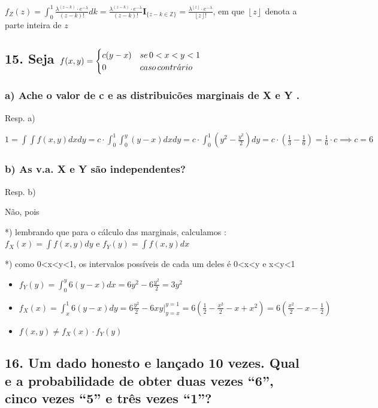 \documentclass[english]{article}
\begin{document}
$f_{Z}(z)=\int_{0}^{1}\frac{\lambda^{(z-k)}\cdot e^{-\lambda}}{(z-k)!}dk=\frac{\lambda^{(z-k)}\cdot e^{-\lambda}}{(z-k)!}\mathbf{I}_{\{z-k\in\mathbb{Z}\}}=\frac{\lambda^{\left\lfloor z\right\rfloor }\cdot e^{-\lambda}}{\left\lfloor z\right\rfloor !}$,
em que $\left\lfloor z\right\rfloor $ denota a parte inteira de $z$


\subsection*{\textmd{15. Seja $f(x,y)=\protect\begin{cases}
c(y-x) & se\,0<x<y<1\protect\\
0 & caso\, contr\acute{a}rio
\protect\end{cases}$}}


\subsubsection*{\textmd{a) Ache o valor de c e as distribuicões marginais de X e
Y . }}

Resp. a)

$1=\int\int f(x,y)dxdy=c\cdot\int_{0}^{1}\int_{0}^{y}(y-x)dxdy=c\cdot\int_{0}^{1}(y^{2}-\frac{y^{2}}{2})dy=c\cdot(\frac{1}{3}-\frac{1}{6})=\frac{1}{6}\cdot c\implies c=6$


\subsubsection*{\textmd{b) As v.a. X e Y são independentes? }}

Resp. b)

Não, pois 

{*}) lembrando que para o cálculo das marginais, calculamos : $f_{X}(x)=\int f(x,y)dy$
e $f_{Y}(y)=\int f(x,y)dx$

{*}) como 0<x<y<1, os intervalos possíveis de cada um deles é 0<x<y
e x<y<1
\begin{itemize}
\item $f_{Y}(y)=\int_{0}^{y}6(y-x)dx=6y^{2}-6\frac{y^{2}}{2}=3y^{2}$
\item $f_{X}(x)=\int_{x}^{1}6(y-x)dy=6\frac{y^{2}}{2}-6xy|_{y=x}^{y=1}=6(\frac{1}{2}-\frac{x^{2}}{2}-x+x^{2})=6(\frac{x^{2}}{2}-x-\frac{1}{2})$
\item $f(x,y)\neq f_{X}(x)\cdot f_{Y}(y)$
\end{itemize}

\subsection*{\textmd{16. Um dado honesto e lançado 10 vezes. Qual e a probabilidade
de obter duas vezes ``6'', cinco vezes ``5'' e três vezes ``1''?}}
\end{document}
